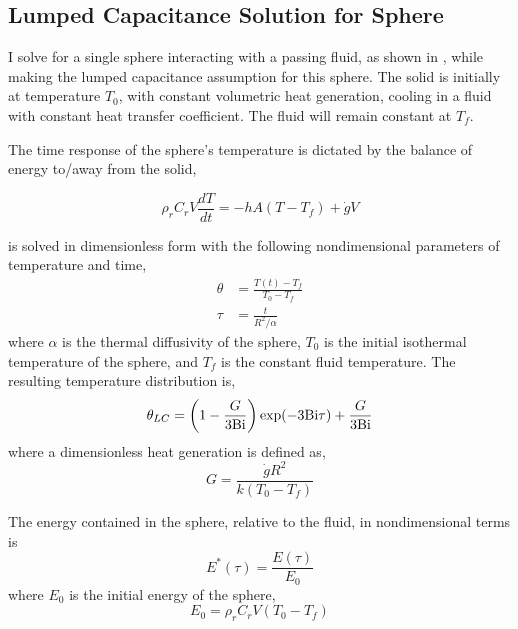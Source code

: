 \subsection{Lumped Capacitance Solution for Sphere}\label{sec:lumped-capacitance}
I solve for a single sphere interacting with a passing fluid, as shown in , while making the lumped capacitance assumption for this sphere. The solid is initially at temperature $T_0$, with constant volumetric heat generation, cooling in a fluid with constant heat transfer coefficient. The fluid will remain constant at $T_f$.

The time response of the sphere's temperature is dictated by the balance of energy to/away from the solid,  

\begin{equation}\label{eq:lc-energy-balance}
	\rho_rC_rV\frac{dT}{dt} = -hA(T-T_f) + \dot{g}V
\end{equation}

 is solved in dimensionless form with the following nondimensional parameters of temperature and time,
\begin{subequations}
\begin{align}
    \theta &= \frac{T(t) - T_f}{T_0 - T_f}\\
    \tau & = \frac{t}{R^2/\alpha}
\end{align}
\end{subequations}
where $\alpha$ is the thermal diffusivity of the sphere, $T_0$ is the initial isothermal temperature of the sphere, and $T_f$ is the constant fluid temperature. The resulting temperature distribution is,
\begin{equation}
\label{eq:theta-lc}
	\theta_{LC}=\left(1-\frac{G}{3\mathrm{Bi}}\right)\exp(-3\mathrm{Bi} \tau) + \frac{G}{3\mathrm{Bi}}
\end{equation}
where a dimensionless heat generation is defined as,
\begin{equation}\label{eq:nondimensional-heat-generation}
	G = \frac{\dot{g}R^2}{k(T_0 - T_f)}
\end{equation}

The energy contained in the sphere, relative to the fluid, in nondimensional terms is 
\begin{equation}
    E^*(\tau)=\frac{E(\tau)}{E_0}
\end{equation}
where $E_0$ is the initial energy of the sphere,
\begin{equation}
    E_0=\rho_rC_rV(T_0-T_f)
\end{equation}

